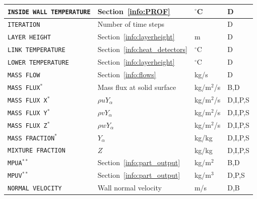 \documentclass[11pt]{book}
\newcommand{\ct}{\tt\small}
\begin{document}
\begin{longtable}{@{\extracolsep{\fill}}|l|l|l|l|}
{\ct INSIDE WALL TEMPERATURE}                   & Section~\ref{info:PROF}                       & $^\circ$C      & D            \\ \hline
{\ct ITERATION}                                 & Number of time steps                          &                & D            \\ \hline
{\ct LAYER HEIGHT}                              & Section~\ref{info:layerheight}                & m              & D            \\ \hline
{\ct LINK TEMPERATURE}                          & Section~\ref{info:heat_detectors}             & $^\circ$C      & D            \\ \hline
{\ct LOWER TEMPERATURE}                         & Section~\ref{info:layerheight}                & $^\circ$C      & D            \\ \hline
{\ct MASS FLOW}                                 & Section~\ref{info:flows}                      & kg/s           & D            \\ \hline
{\ct MASS FLUX}$^*$                             & Mass flux at solid surface                    & kg/m$^2$/s     & B,D          \\ \hline
{\ct MASS FLUX X}$^*$                           & $\rho u Y_\alpha$                             & kg/m$^2$/s     & D,I,P,S      \\ \hline
{\ct MASS FLUX Y}$^*$                           & $\rho v Y_\alpha$                             & kg/m$^2$/s     & D,I,P,S      \\ \hline
{\ct MASS FLUX Z}$^*$                           & $\rho w Y_\alpha$                             & kg/m$^2$/s     & D,I,P,S      \\ \hline
{\ct MASS FRACTION}$^*$                         & $Y_\alpha$                                    & kg/kg          & D,I,P,S      \\ \hline
{\ct MIXTURE FRACTION}                          & $Z$                                           & kg/kg          & D,I,P,S      \\ \hline
{\ct MPUA}$^{**}$                               & Section~\ref{info:part_output}                & kg/m$^2$       & B,D          \\ \hline
{\ct MPUV}$^{**}$                               & Section~\ref{info:part_output}                & kg/m$^3$       & D,P,S        \\ \hline
{\ct NORMAL VELOCITY}                           & Wall normal velocity                          & m/s            & D,B          \\ \hline

\end{longtable}
\end{document}
